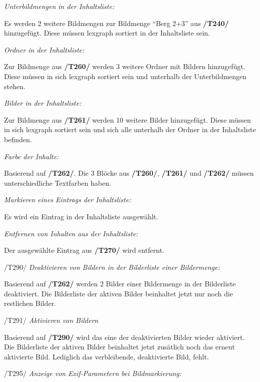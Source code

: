 \begin{description}
			\item[/T260/] \textit{Unterbildmengen in der Inhaltsliste:}\par Es werden 2 weitere Bildmengen zur Bildmenge "`Berg 2+3"' aus \textbf{/T240/} hinzugefügt. Diese müssen \gls{lexgraph} sortiert in der Inhaltsliste sein.
			\item[/T261/] \textit{Ordner in der Inhaltsliste:}\par Zur Bildmenge aus \textbf{/T260/} werden 3 weitere Ordner mit Bildern hinzugefügt. Diese müssen in sich \gls{lexgraph} sortiert sein und unterhalb der Unterbildmengen stehen.
			\item[/T262/] \textit{Bilder in der Inhaltsliste:}\par Zur Bildmenge aus \textbf{/T261/} werden 10 weitere Bilder hinzugefügt. Diese müssen in sich \gls{lexgraph} sortiert sein und sich alle unterhalb der Ordner in der Inhaltsliste befinden.
			\item[/T263/] \textit{Farbe der Inhalte:}\par Basierend auf \textbf{/T262/}. Die 3 Blöcke aus \textbf{/T260/}, \textbf{/T261/} und \textbf{/T262/} müssen unterschiedliche Textfarben haben. 
		
			\item[/T270/] \textit{Markieren eines Eintrags der Inhaltsliste:}\par Es wird ein Eintrag in der Inhaltsliste ausgewählt.
		
			\item[/T280/] \textit{Entfernen von Inhalten aus der Inhaltsliste:}\par Der ausgewählte Eintrag aus \textbf{/T270/} wird entfernt.
		
			\item{/T290/} \textit{Deaktivieren von Bildern in der Bilderliste einer Bildermenge:}\par Basierend auf \textbf{/T262/} werden 2 Bilder einer Bildermenge in der Bilderliste deaktiviert. Die Bilderliste der aktiven Bilder beinhaltet jetzt nur noch die restlichen Bilder.
			\item{/T291/} \textit{Aktivieren von Bildern}\par Basierend auf \textbf{/T290/} wird das eine der deaktivierten Bilder wieder aktiviert. Die Bilderliste der aktiven Bilder beinhaltet jetzt zusätlich noch das erneut aktivierte Bild. Lediglich das verbleibende, deaktivierte Bild, fehlt.
			
			\item{/T295/} \textit{Anzeige von Exif-Parametern bei Bildmarkierung:}\par
			
		\end{description}
	
